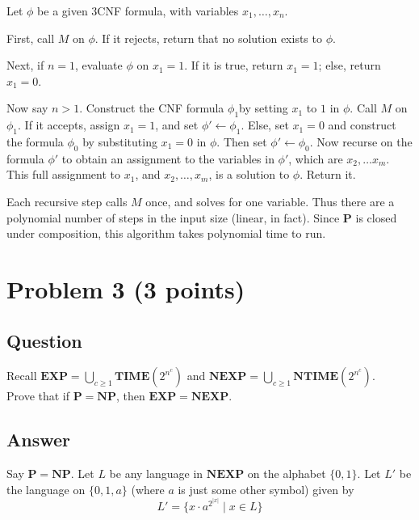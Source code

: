 \documentclass{article}
\renewcommand{\P}{\mathbf{P}}
\newcommand{\NP}{\mathbf{NP}}
\newcommand{\EXP}{\mathbf{EXP}}
\newcommand{\NEXP}{\mathbf{NEXP}}
\newcommand{\TIME}{\mathbf{TIME}}
\newcommand{\NTIME}{\mathbf{NTIME}}
\begin{document}
	Let $\phi$ be a given 3CNF formula, with variables $x_1, \dots, x_n$.

	First, call $M$ on $\phi$.  If it rejects, return that no solution exists to $\phi$.

	Next, if $n = 1$, evaluate $\phi$ on $x_1 = 1$.  If it is true, return $x_1 = 1$; else, return $x_1 = 0$.

	Now say $n > 1$.  Construct the CNF formula $\phi_1$by setting $x_1$ to $1$ in $\phi$.  Call $M$ on $\phi_1$.  If it accepts, assign $x_1 = 1$, and set $\phi' \gets \phi_1$.  Else, set $x_1 = 0$ and construct the formula $\phi_0$ by substituting $x_1 = 0$ in $\phi$.  Then set $\phi' \gets \phi_0$.  Now recurse on the formula $\phi'$ to obtain an assignment to the variables in $\phi'$, which are $x_2, \dots x_m$.  This full assignment to $x_1$, and $x_2, \dots, x_m$, is a solution to $\phi$.  Return it.

	Each recursive step calls $M$ once, and solves for one variable.  Thus there are a polynomial number of steps in the input size (linear, in fact).  Since $\P$ is closed under composition, this algorithm takes polynomial time to run.


    \section*{Problem 3 (3 points)}
	\subsection*{Question}
    Recall $\EXP = \bigcup_{c\ge 1} \TIME(2^{n^c})$ and $\NEXP = \bigcup_{c\ge 1} \NTIME(2^{n^c})$. \\
    Prove that if $\P = \NP$, then $\EXP = \NEXP$.

	\subsection*{Answer}
	Say $\P = \NP$.  Let $L$ be any language in $\NEXP$ on the alphabet $\{0, 1\}$.  Let $L'$ be the language on $\{0, 1, a\}$ (where $a$ is just some other symbol) given by
	$$L' = \{x \cdot a^{2^{|x|}} \mid x \in L\}$$
\end{document}

